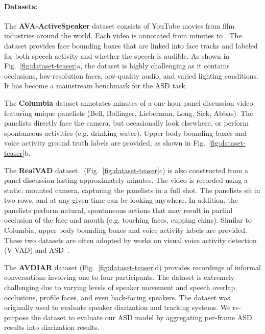 \documentclass[sigconf]{acmart}
\begin{document}
\begin{CCSXML}
\paragraph{Datasets:} The \textbf{AVA-ActiveSpeaker} dataset \cite{DBLP:conf/icassp/RothCKMGKRSSXP20} consists of  YouTube movies from film industries around the world. Each video is annotated from minutes  to . The dataset provides face bounding boxes that are linked into face tracks and labeled for both speech activity and whether the speech is audible. As shown in Fig.~\ref{fig:dataset-teaser}a, the dataset is highly challenging as it contains occlusions, low-resolution faces, low-quality audio, and varied lighting conditions. It has become a mainstream benchmark for the ASD task.

The \textbf{Columbia} dataset \cite{DBLP:conf/eccv/ChakravartyT16} annotates  minutes of a one-hour panel discussion video featuring  unique panelists (Bell, Bollinger, Lieberman, Long, Sick, Abbas). The panelists directly face the camera, but occasionally look elsewhere, or perform spontaneous activities (e.g. drinking water). Upper body bounding boxes and voice activity ground truth labels are provided, as shown in Fig.~\ref{fig:dataset-teaser}b.

The \textbf{RealVAD} dataset~\cite{9133504} (Fig.~\ref{fig:dataset-teaser}c) is also constructed from a panel discussion lasting approximately  minutes. The video is recorded using a static, mounted camera, capturing the  panelists in a full shot. The panelists sit in two rows, and at any given time can be looking anywhere. In addition, the panelists perform natural, spontaneous actions that may result in partial occlusion of the face and mouth (e.g. touching faces, cupping chins). Similar to Columbia, upper body bounding boxes and voice activity labels are provided. These two datasets are often adopted by works on visual voice activity detection (V-VAD) and ASD~\cite{DBLP:conf/iccvw/ShahidBM19,Shahid_2021_WACV,DBLP:conf/accv/ChungZ16a,DBLP:conf/eccv/AfourasOCZ20}.

The \textbf{AVDIAR} dataset \cite{DBLP:journals/pami/GebruBLH18} (Fig.~\ref{fig:dataset-teaser}d) provides  recordings of informal conversations involving one to four participants. The dataset is extremely challenging due to varying levels of speaker movement and speech overlap, occlusions, profile faces, and even back-facing speakers. The dataset was originally used to evaluate speaker diarization and tracking systems. We re-purpose the dataset to evaluate our ASD model by aggregating per-frame ASD results into diarization results.
\vspace{-2ex}

\end{CCSXML}
\end{document}
